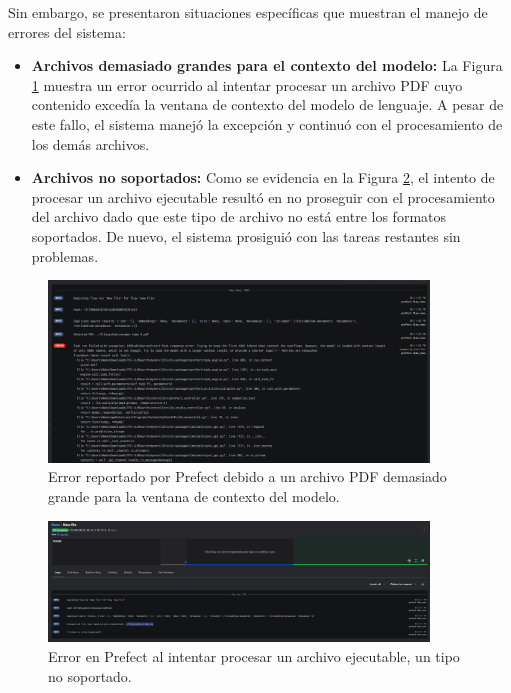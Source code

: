 Sin embargo, se presentaron situaciones específicas que muestran el manejo de errores del sistema:
\begin{itemize}
\item \textbf{Archivos demasiado grandes para el contexto del modelo:} La Figura \ref{fig:prefect_fail_size} muestra un error ocurrido al intentar procesar un archivo PDF cuyo contenido excedía la ventana de contexto del modelo de lenguaje. A pesar de este fallo, el sistema manejó la excepción y continuó con el procesamiento de los demás archivos.
\item \textbf{Archivos no soportados:} Como se evidencia en la Figura \ref{fig:prefect_not_valid_type}, el intento de procesar un archivo ejecutable resultó en no proseguir con el procesamiento del archivo dado que este tipo de archivo no está entre los formatos soportados. De nuevo, el sistema prosiguió con las tareas restantes sin problemas.
\end{itemize}

\begin{figure}[H]
\centering
\includegraphics[width=0.9\textwidth]{archivos/prefect_fail.png}
\caption[Error en Prefect al procesar un archivo demasiado grande]{Error reportado por Prefect debido a un archivo PDF demasiado grande para la ventana de contexto del modelo.}
\label{fig:prefect_fail_size}
\end{figure}

\begin{figure}[H]
\centering
\includegraphics[width=0.9\textwidth]{archivos/prefect_not_valid.png}
\caption[Error en Prefect al procesar un archivo no soportado]{Error en Prefect al intentar procesar un archivo ejecutable, un tipo no soportado.}
\label{fig:prefect_not_valid_type}
\end{figure}

